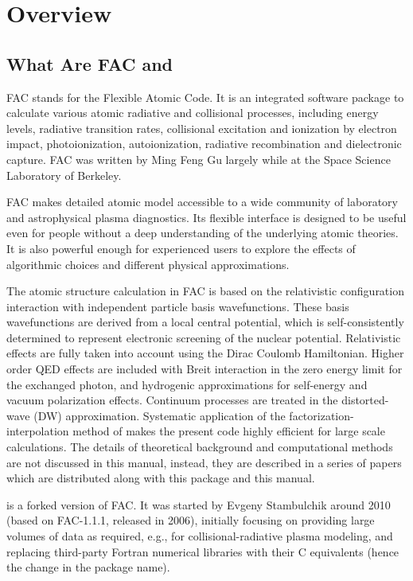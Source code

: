 \chapter{Overview}
\label{cha:overview}

\section{What Are FAC and \cFAC}
FAC stands for the Flexible Atomic Code. It is an integrated software package to
calculate various atomic radiative and collisional processes, including energy
levels, radiative transition rates, collisional excitation and  ionization by
electron impact, photoionization, autoionization, radiative recombination and
dielectronic capture. FAC was written by Ming Feng Gu largely while at the Space
Science Laboratory of Berkeley. 

FAC makes detailed atomic model accessible to a wide community of laboratory and
astrophysical plasma diagnostics. Its flexible interface is designed to be
useful even for people without a deep understanding of the underlying atomic
theories. It is also powerful enough for experienced users to explore the
effects of algorithmic choices and different physical approximations.

The atomic structure calculation in FAC is based on the relativistic
configuration interaction with independent particle basis wavefunctions. These
basis wavefunctions are derived from a local central potential, which is
self-consistently determined to represent electronic screening of the nuclear
potential. Relativistic effects are fully taken into account using the Dirac
Coulomb Hamiltonian. Higher order QED effects are included with Breit
interaction in the zero energy limit for the exchanged photon, and hydrogenic
approximations for self-energy and vacuum polarization effects. 
Continuum processes are treated
in the distorted-wave (DW) approximation. Systematic application of the
factorization-interpolation method of \citet{barshalom:1988a} makes the present
code highly efficient for large scale calculations. The details of theoretical
background and computational methods are not discussed in this manual,
instead, they are described in a series of papers which are distributed along
with this package and this manual.

\cFAC is a forked version of FAC. It was started by Evgeny Stambulchik
around 2010 (based on FAC-1.1.1, released in 2006), initially focusing on
providing large volumes of data as required, e.g., for collisional-radiative
plasma modeling, and replacing third-party Fortran numerical libraries with
their C equivalents (hence the change in the package name).

